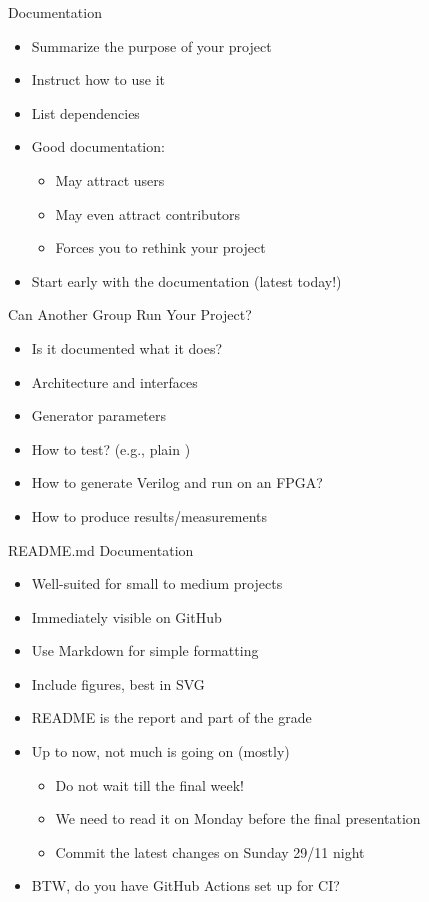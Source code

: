 \begin{frame}[fragile]{Documentation}
\begin{itemize}
\item Summarize the purpose of your project
\item Instruct how to use it
\item List dependencies
\item Good documentation:
\begin{itemize}
\item May attract users
\item May even attract contributors
\item Forces you to rethink your project
\end{itemize}
\item Start early with the documentation (latest today!)
\end{itemize}
\end{frame}

\begin{frame}[fragile]{Can Another Group Run Your Project?}
\begin{itemize}
\item Is it documented what it does?
\item Architecture and interfaces
\item Generator parameters
\item How to test? (e.g., plain )
\item How to generate Verilog and run on an FPGA?
\item How to produce results/measurements
\end{itemize}
\end{frame}

\begin{frame}[fragile]{README.md Documentation}
\begin{itemize}
\item Well-suited for small to medium projects
\item Immediately visible on GitHub
\item Use Markdown for simple formatting
\item Include figures, best in SVG
\item README is the report and part of the grade
\item Up to now, not much is going on (mostly)
\begin{itemize}
\item Do not wait till the final week!
\item We need to read it on Monday before the final presentation
\item Commit the latest changes on Sunday 29/11 night
\end{itemize}
\item BTW, do you have GitHub Actions set up for CI?
\end{itemize}
\end{frame}

